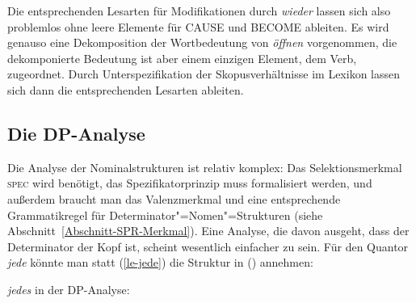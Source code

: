 Die entsprechenden Lesarten für Modifikationen durch \emph{wieder} lassen sich also problemlos ohne
leere Elemente für CAUSE und BECOME ableiten. Es wird genauso eine Dekomposition der Wortbedeutung
von \emph{öffnen} vorgenommen, die dekomponierte Bedeutung ist aber einem einzigen Element, dem Verb, zugeordnet. Durch
Unterspezifikation der Skopusverhältnisse im Lexikon lassen sich dann die entsprechenden Lesarten
ableiten.




\subsection{Die DP-Analyse}
\label{sec-dp-analyse}

\mbox{}%
Die Analyse der Nominalstrukturen ist relativ komplex: Das Selektionsmerkmal \textsc{spec} wird benötigt,
das Spezifikatorprinzip muss formalisiert werden, und außerdem braucht man das Valenzmerkmal \spr
und eine entsprechende Grammatikregel für Determinator"=Nomen"=Strukturen (siehe
Abschnitt~\ref{Abschnitt-SPR-Merkmal}). Eine Analyse, die davon ausgeht, dass der Determinator der
Kopf ist, scheint wesentlich einfacher zu sein. Für den Quantor \emph{jede} könnte man
statt (\ref{le-jede}) die Struktur in () annehmen:

\eas
\emph{jedes} in der DP-Analyse:\\
\zs

